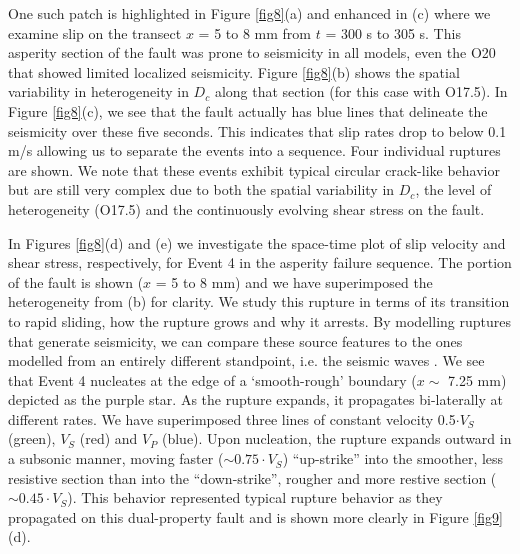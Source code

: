 \documentclass[final,3p, 11pt,authoryear]{elsarticle}
\begin{document}
One such patch is highlighted in Figure \ref{fig8}(a) and enhanced in (c) where we examine slip on the transect $x$ = 5 to 8 mm from $t$ = 300 s to 305 s.  This asperity section of the fault was prone to seismicity in all models, even the O20 that showed limited localized seismicity. Figure \ref{fig8}(b) shows the spatial variability in heterogeneity in $D_{c}$ along that section (for this case with O17.5). In Figure \ref{fig8}(c), we see that the fault actually has blue lines that delineate the seismicity over these five seconds.  This indicates that slip rates drop to below 0.1 m/s allowing us to separate the events into a sequence.  Four individual ruptures are shown.  We note that these events exhibit typical circular crack-like behavior but are still very complex due to both the spatial variability in $D_{c}$, the level of heterogeneity (O17.5) and the continuously evolving shear stress on the fault.  

In Figures \ref{fig8}(d) and (e) we investigate the space-time plot of slip velocity and shear stress, respectively, for Event 4 in the asperity failure sequence. The portion of the fault is shown ($x$ = 5 to 8 mm) and we have superimposed the heterogeneity from (b) for clarity.  We study this rupture in terms of its transition to rapid sliding, how the rupture grows and why it arrests. By modelling ruptures that generate seismicity, we can compare these source features to the ones modelled from an entirely different standpoint, i.e. the seismic waves \citep{Selvadurai2019}. We see that Event 4 nucleates at the edge of a `smooth-rough' boundary ($x \sim$ 7.25 mm) depicted as the purple star. As the rupture expands, it propagates bi-laterally at different rates. We have superimposed three lines of constant velocity 0.5$\cdot V_{S}$ (green), $V_{S}$ (red) and $V_{P}$ (blue).  Upon nucleation, the rupture expands outward in a subsonic manner, moving faster ($\sim 0.75 \cdot V_{S}$) ``up-strike'' into the smoother, less resistive section than into the ``down-strike'', rougher and more restive section ($\sim 0.45\cdot V_{S}$). This behavior represented typical rupture behavior as they propagated on this dual-property fault and is shown more clearly in Figure \ref{fig9}(d).
\end{document}
